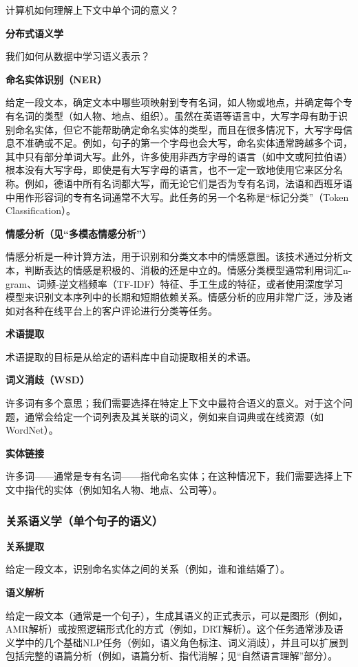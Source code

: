 计算机如何理解上下文中单个词的意义？

\textbf{分布式语义学}  

我们如何从数据中学习语义表示？

\textbf{命名实体识别（NER）} 

给定一段文本，确定文本中哪些项映射到专有名词，如人物或地点，并确定每个专有名词的类型（如人物、地点、组织）。虽然在英语等语言中，大写字母有助于识别命名实体，但它不能帮助确定命名实体的类型，而且在很多情况下，大写字母信息不准确或不足。例如，句子的第一个字母也会大写，命名实体通常跨越多个词，其中只有部分单词大写。此外，许多使用非西方字母的语言（如中文或阿拉伯语）根本没有大写字母，即使是有大写字母的语言，也不一定一致地使用它来区分名称。例如，德语中所有名词都大写，而无论它们是否为专有名词，法语和西班牙语中用作形容词的专有名词通常不大写。此任务的另一个名称是“标记分类”（Token Classification）。

\textbf{情感分析（见“多模态情感分析”）}  

情感分析是一种计算方法，用于识别和分类文本中的情感意图。该技术通过分析文本，判断表达的情感是积极的、消极的还是中立的。情感分类模型通常利用词汇n-gram、词频-逆文档频率（TF-IDF）特征、手工生成的特征，或者使用深度学习模型来识别文本序列中的长期和短期依赖关系。情感分析的应用非常广泛，涉及诸如对各种在线平台上的客户评论进行分类等任务。

\textbf{术语提取}  

术语提取的目标是从给定的语料库中自动提取相关的术语。

\textbf{词义消歧（WSD）}  

许多词有多个意思；我们需要选择在特定上下文中最符合语义的意义。对于这个问题，通常会给定一个词列表及其关联的词义，例如来自词典或在线资源（如WordNet）。

\textbf{实体链接}  

许多词——通常是专有名词——指代命名实体；在这种情况下，我们需要选择上下文中指代的实体（例如知名人物、地点、公司等）。
\subsubsection{关系语义学（单个句子的语义）}
\textbf{关系提取}  

给定一段文本，识别命名实体之间的关系（例如，谁和谁结婚了）。

\textbf{语义解析}  

给定一段文本（通常是一个句子），生成其语义的正式表示，可以是图形（例如，AMR解析）或按照逻辑形式化的方式（例如，DRT解析）。这个任务通常涉及语义学中的几个基础NLP任务（例如，语义角色标注、词义消歧），并且可以扩展到包括完整的语篇分析（例如，语篇分析、指代消解；见“自然语言理解”部分）。

